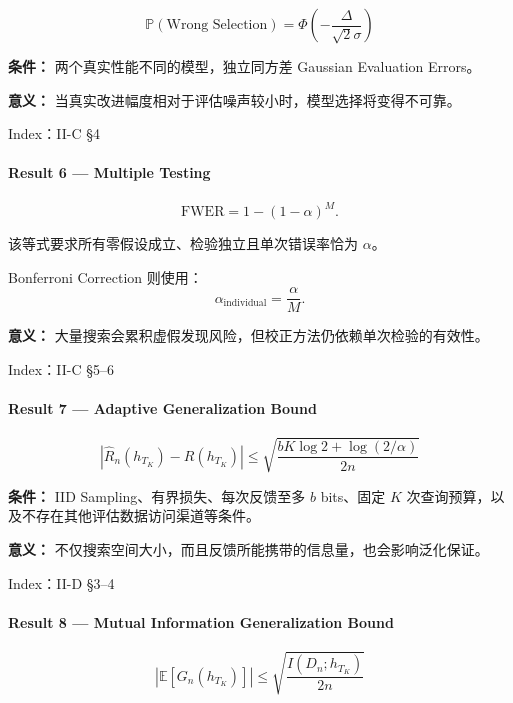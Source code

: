 \[\boxed{
\mathbb P(\text{Wrong Selection})
=
\Phi\left(-\frac{\Delta}{\sqrt2\sigma}\right)
}\]

\textbf{条件：} 两个真实性能不同的模型，独立同方差 Gaussian Evaluation Errors。

\textbf{意义：} 当真实改进幅度相对于评估噪声较小时，模型选择将变得不可靠。

Index：II-C §4

\hypertarget{part-2-27-0001-result-6-multiple-testing}{%
\paragraph{Result 6 --- Multiple Testing}\label{part-2-27-0001-result-6-multiple-testing}}

\[\mathrm{FWER}=1-(1-\alpha)^M.\]

该等式要求所有零假设成立、检验独立且单次错误率恰为 \(\alpha\)。

Bonferroni Correction 则使用：
\[\alpha_{\mathrm{individual}}=\frac{\alpha}{M}.\]

\textbf{意义：} 大量搜索会累积虚假发现风险，但校正方法仍依赖单次检验的有效性。

Index：II-C §5--6

\hypertarget{part-2-27-0001-result-7-adaptive-generalization-bound}{%
\paragraph{Result 7 --- Adaptive Generalization Bound}\label{part-2-27-0001-result-7-adaptive-generalization-bound}}

\[\boxed{
|\widehat R_n(h_{T_K})-R(h_{T_K})|
\leq
\sqrt{
\frac{bK\log2+\log(2/\alpha)}{2n}
}
}\]

\textbf{条件：} IID Sampling、有界损失、每次反馈至多 \(b\) bits、固定 \(K\) 次查询预算，以及不存在其他评估数据访问渠道等条件。

\textbf{意义：} 不仅搜索空间大小，而且反馈所能携带的信息量，也会影响泛化保证。

Index：II-D §3--4

\hypertarget{part-2-27-0001-result-8-mutual-information-generalization-bound}{%
\paragraph{Result 8 --- Mutual Information Generalization Bound}\label{part-2-27-0001-result-8-mutual-information-generalization-bound}}

\[\boxed{
|\mathbb E[G_n(h_{T_K})]|
\leq
\sqrt{\frac{I(D_n;h_{T_K})}{2n}}
}\]

